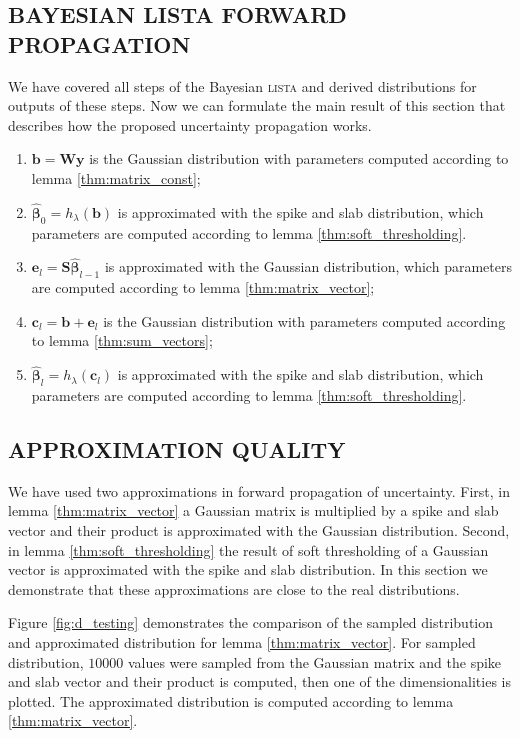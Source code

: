 \documentclass[letterpaper]{article}
\begin{document}
\subsection{\uppercase{Bayesian lista forward propagation}}
We have covered all steps of the Bayesian \textsc{lista} and derived distributions for outputs of these steps. Now we can formulate the main result of this section that describes how the proposed uncertainty propagation works.

\begin{enumerate}
	\item $\mathbf{b} = \mathbf{W}\mathbf{y}$ is the Gaussian distribution with parameters computed according to lemma \ref{thm:matrix_const};
	\item $\widehat{\boldsymbol\beta}_{0} = h_\lambda(\mathbf{b})$ is approximated with the spike and slab distribution, which parameters are computed according to lemma \ref{thm:soft_thresholding}.
	\item $\mathbf{e}_l = \mathbf{S}\widehat{\boldsymbol\beta}_{l-1}$ is approximated with the Gaussian distribution, which parameters are computed according to lemma \ref{thm:matrix_vector};
	\item $\mathbf{c}_l = \mathbf{b} + \mathbf{e}_l$ is the Gaussian distribution with parameters computed according to lemma \ref{thm:sum_vectors};
	\item $\widehat{\boldsymbol\beta}_{l} = h_\lambda(\mathbf{c}_l)$ is approximated with the spike and slab distribution, which parameters are computed according to lemma \ref{thm:soft_thresholding}.
\end{enumerate}


\subsection{\uppercase{Approximation quality}}
\label{sec:approx_quality}
We have used two approximations in forward propagation of uncertainty. First, in lemma \ref{thm:matrix_vector} a Gaussian matrix is multiplied by a spike and slab vector and their product is approximated with the Gaussian distribution. Second, in lemma \ref{thm:soft_thresholding} the result of soft thresholding of a Gaussian vector is approximated with the spike and slab distribution. In this section we demonstrate that these approximations are close to the real distributions.

Figure \ref{fig:d_testing} demonstrates the comparison of the sampled distribution and approximated distribution for lemma \ref{thm:matrix_vector}. For sampled distribution, $10000$ values were sampled from the Gaussian matrix and the spike and slab vector and their product is computed, then one of the dimensionalities is plotted. The approximated distribution is computed according to lemma \ref{thm:matrix_vector}.
\end{document}
